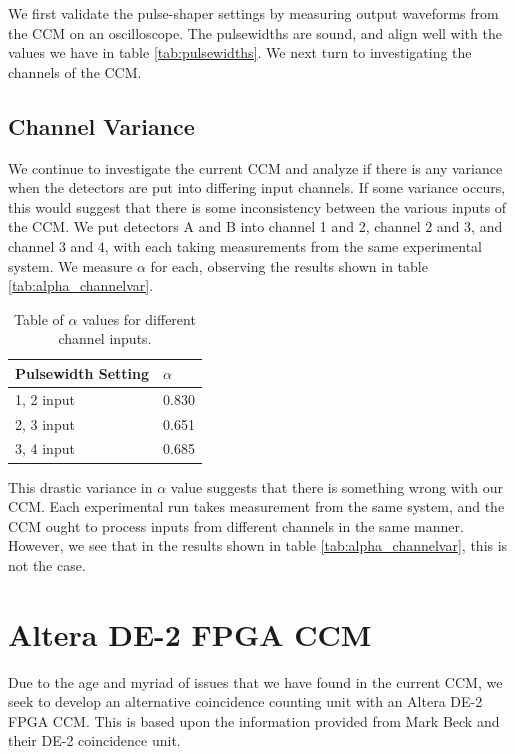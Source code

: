\documentclass[letterpaper, 11 pt]{article}
\begin{document}
We first validate the pulse-shaper settings by measuring output waveforms from the CCM on an oscilloscope.
The pulsewidths are sound, and align well with the values we have in table \ref{tab:pulsewidths}. We
next turn to investigating the channels of the CCM.

\subsection{Channel Variance}

We continue to investigate the current CCM and analyze if there is any variance when the detectors
are put into differing input channels. If some variance occurs, this would suggest that there is some
inconsistency between the various inputs of the CCM. We put detectors A and B into channel 1 and 2,
channel 2 and 3, and channel 3 and 4, with each taking measurements from the same experimental system.
We measure $\alpha$ for each, observing the results shown in table \ref{tab:alpha_channelvar}.
\begin{table}[H]
    \centering
    \begin{tabular}{|l|l|}
    \hline
    \textbf{Pulsewidth Setting} & \textbf{$\alpha$} \\ \hline
    1, 2 input        & 0.830                   \\ \hline
    2, 3 input        & 0.651                   \\ \hline
    3, 4 input        & 0.685                   \\ \hline
    \end{tabular}
    \caption{Table of $\alpha$ values for different channel inputs.}
\end{table}\label{tab:alpha_channelvar}
This drastic variance in $\alpha$ value suggests that there is something wrong with our CCM.
Each experimental run takes measurement from the same system, and the CCM ought to process inputs
from different channels in the same manner. However, we see that in the results shown in table \ref{tab:alpha_channelvar},
this is not the case.

\section{Altera DE-2 FPGA CCM}

Due to the age and myriad of issues that we have found in the current CCM,
we seek to develop an alternative coincidence counting unit with an Altera DE-2 FPGA CCM.
This is based upon the information provided from Mark Beck and their DE-2 coincidence unit.
\end{document}

